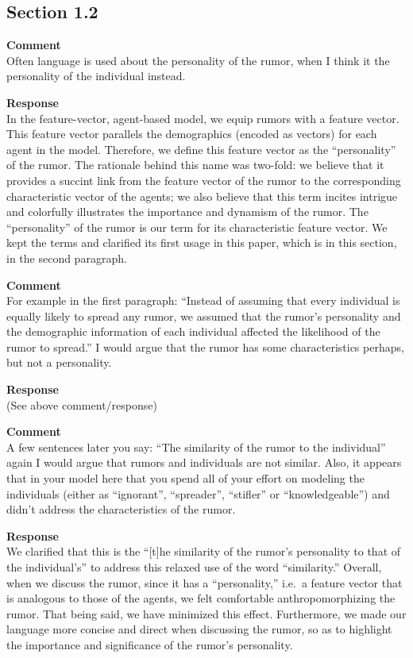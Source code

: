 \subsection{Section 1.2}
\setcounter{rev2-1.2}{1}

\textbf{Comment } \\
Often language is used about the personality of the rumor, when I think it the personality of the individual instead.

\textbf{Response } \\
In the feature-vector, agent-based model, we equip rumors with a feature vector.
This feature vector parallels the demographics (encoded as vectors) for each agent in the model.
Therefore, we define this feature vector as the ``personality'' of the rumor.
The rationale behind this name was two-fold: we believe that it provides a succint link from the feature vector of the rumor to the corresponding characteristic vector of the agents; we also believe that this term incites intrigue and colorfully illustrates the importance and dynamism of the rumor.
The ``personality'' of the rumor is our term for its characteristic feature vector.
We kept the terms and clarified its first usage in this paper, which is in this section, in the second paragraph.


\textbf{Comment } \\
For example in the first paragraph: ``Instead of assuming that every individual is equally likely to spread any rumor, we assumed that the rumor's personality and the demographic information of each individual affected the likelihood of the rumor to spread.''
I would argue that the rumor has some characteristics perhaps, but not a personality.

\textbf{Response } \\
(See above comment/response)

\textbf{Comment } \\
A few sentences later you say: ``The similarity of the rumor to the individual\textellipsis'' again I would argue that rumors and individuals are not similar.
Also, it appears that in your model here that you spend all of your effort on modeling the individuals (either as ``ignorant'', ``spreader'', ``stiﬂer'' or ``knowledgeable'') and didn't address the characteristics of the rumor.

\textbf{Response } \\
We clarified that this is the ``[t]he similarity of the rumor's personality to that of the individual's'' to address this relaxed use of the word ``similarity.''
Overall, when we discuss the rumor, since it has a ``personality,'' i.e.\ a feature vector that is analogous to those of the agents, we felt comfortable anthropomorphizing the rumor.
That being said, we have minimized this effect.
Furthermore, we made our language more concise and direct when discussing the rumor, so as to highlight the importance and significance of the rumor's personality.
